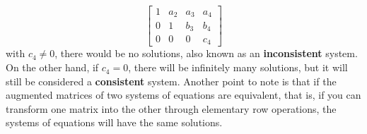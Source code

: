 \documentclass[nobib]{tufte-handout}
\begin{document}
\begin{equation*}
    \begin{bmatrix}
        1 & a_2 & a_3 & a_4 \\
        0 & 1   & b_3 & b_4 \\
        0 & 0   & 0   & c_4
    \end{bmatrix}
\end{equation*}
with $c_4 \neq 0$, there would be no solutions, also known as an \textbf{inconsistent} system. On the other hand, if $c_4 = 0$, there will be infinitely many solutions, but it will still be considered a \textbf{consistent} system.
Another point to note is that if the augmented matrices of two systems of equations are equivalent,
that is, if you can transform one matrix into the other through elementary row operations, the systems of equations will have the same solutions.
\pagebreak
\end{document}
